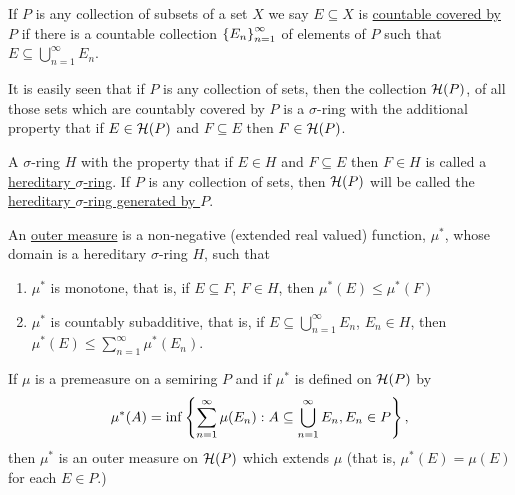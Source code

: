 \begin{definition}
If $P$ is any collection of subsets of a set $X$ we say $E\subseteq X$ is \underline{countable covered by} $P$ if there is a countable collection $\left\{E_n\right\}_{n=1}^\infty$ of elements of $P$ such that $E\subseteq\bigcup_{n=1}^\infty E_n$.
\end{definition}

It is easily seen that if $P$ is any collection of sets, then the collection ${\cal H}(P)$, of all those sets which are countably covered by $P$ is a $\sigma$-ring with the additional property that if $E\in{\cal H}(P)$ and $F\subseteq E$ then $F\in{\cal H}(P)$.

\begin{definition}
A $\sigma$-ring $H$ with the property that if $E\in H$ and $F\subseteq E$ then $F\in H$ is called a \underline{hereditary $\sigma$-ring}.
If $P$ is any collection of sets, then ${\cal H}(P)$ will be called the \underline{hereditary $\sigma$-ring generated by $P$}.
\end{definition}

\begin{definition}
An \underline{outer measure} is a non-negative (extended real valued) function, $\mu^*$, whose domain is a hereditary $\sigma$-ring $H$, such that
\begin{enumerate}[label=\arabic*)]
    \item $\mu^*$ is monotone, that is, if $E\subseteq F$, $F\in H$, then $\mu^*(E)\leq\mu^*(F)$
    \item $\mu^*$ is countably subadditive, that is, if $E\subseteq\bigcup_{n=1}^\infty E_n$, $E_n\in H$, then $\mu^*(E)\leq\sum_{n=1}^\infty\mu^*(E_n)$.
\end{enumerate}
\end{definition}

\begin{theorem}
If $\mu$ is a premeasure on a semiring $P$ and if $\mu^*$ is defined on ${\cal H}(P)$ by $$\mu^*(A)=\inf \left\{\sum_{n=1}^\infty\mu(E_n): A\subseteq\bigcup_{n=1}^\infty E_n, E_n \in P\right\},$$ then $\mu^*$ is an outer measure on ${\cal H}(P)$ which extends $\mu$ (that is, $\mu^*(E)=\mu(E)$ for each $E\in P$.)
\end{theorem}

